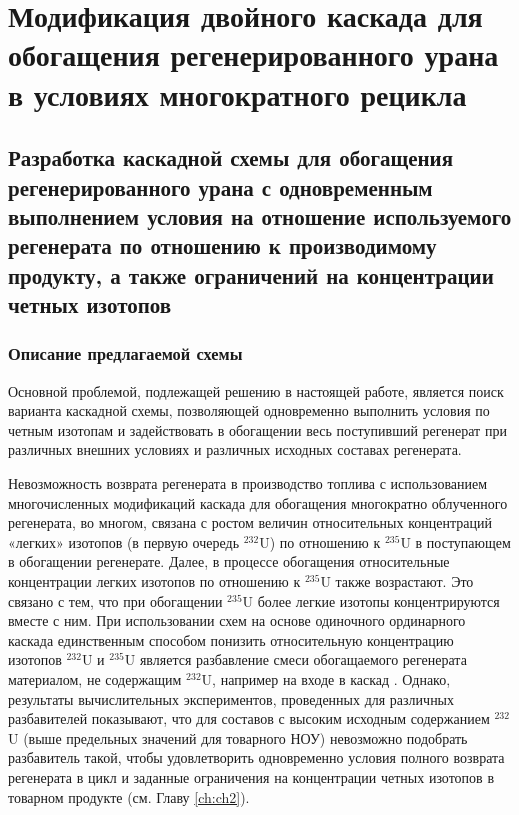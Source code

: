 \chapter{Модификация двойного каскада для обогащения регенерированного урана в условиях многократного рецикла}\label{ch:ch3}

\section{Разработка каскадной схемы для обогащения регенерированного урана с одновременным выполнением условия на отношение используемого регенерата по отношению к производимому продукту, а также ограничений на концентрации четных изотопов}
\subsection{Описание предлагаемой схемы}\label{triple_descr}

Основной проблемой, подлежащей решению в настоящей работе, является поиск варианта каскадной схемы, позволяющей одновременно выполнить условия по четным изотопам и задействовать в обогащении весь поступивший регенерат при различных внешних условиях и различных исходных составах регенерата.

Невозможность возврата регенерата в производство топлива с использованием многочисленных модификаций каскада для обогащения многократно облученного регенерата, во многом, связана с ростом величин относительных концентраций «легких» изотопов (в первую очередь $^{232}$U) по отношению к $^{235}$U в поступающем в обогащении регенерате. Далее, в процессе обогащения относительные концентрации легких изотопов по отношению к $^{235}$U также возрастают. Это связано с тем, что при обогащении $^{235}$U более легкие изотопы концентрируются вместе с ним. При использовании схем на основе одиночного ординарного каскада единственным способом понизить относительную концентрацию изотопов  $^{232}$U и $^{235}$U является разбавление смеси обогащаемого регенерата материалом, не содержащим $^{232}$U, например на входе в каскад \cite{smirnovKaskadnyeShemyZadachah2012}. Однако, результаты вычислительных экспериментов, проведенных для различных разбавителей показывают, что для составов с высоким исходным содержанием $^{232}$U (выше предельных значений для товарного НОУ) невозможно подобрать разбавитель такой, чтобы удовлетворить одновременно условия полного возврата регенерата в цикл и заданные ограничения на концентрации четных изотопов в товарном продукте (см. Главу \ref{ch:ch2}). 

